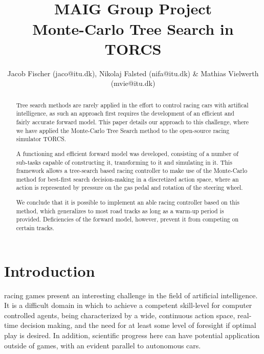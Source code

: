 \documentclass[conference]{IEEEtran}
\begin{document}
\title{\ \\ \LARGE\bf MAIG Group Project \\ Monte-Carlo Tree Search in TORCS}

\author{Jacob Fischer (jaco@itu.dk), Nikolaj Falsted (nifa@itu.dk) \& Mathias Vielwerth (mvie@itu.dk)}

\maketitle

\thispagestyle{plain}
\pagestyle{plain}

\begin{abstract}
Tree search methods are rarely applied in the effort to control racing cars with artifical intelligence, as such an approach first requires the development of an efficient and fairly accurate forward model. This paper details our approach to this challenge, where we have applied the Monte-Carlo Tree Search method to the open-source racing simulator TORCS. 

A functioning and efficient forward model was developed, consisting of a number of sub-tasks capable of constructing it, transforming to it and simulating in it. This framework allows a tree-search based racing controller to make use of the Monte-Carlo method for best-first search decision-making in a discretized action space, where an action is represented by pressure on the gas pedal and rotation of the steering wheel.

We conclude that it is possible to implement an able racing controller based on this method, which generalizes to most road tracks as long as a warm-up period is provided. Deficiencies of the forward model, however, prevent it from competing on certain tracks.
\end{abstract}

\section{Introduction}
 racing games present an interesting challenge in the field of artificial intelligence. It is a difficult domain in which to achieve a competent skill-level for computer controlled agents, being characterized by a wide, continuous action space, real-time decision making, and the need for at least some level of foresight if optimal play is desired. In addition, scientific progress here can have potential application outside of games, with an evident parallel to autonomous cars.
\end{document}
